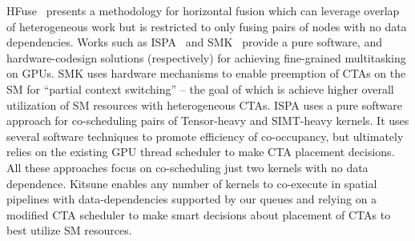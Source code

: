 HFuse~\cite{horizontal-fusion:cgo2022} presents a methodology for horizontal fusion which can leverage overlap of heterogeneous work but is restricted to only fusing pairs of nodes with no data dependencies. Works such as ISPA~\cite{zhao2022ispa} and SMK~\cite{wang2016simultaneous} provide a pure software, and hardware-codesign solutions (respectively) for achieving fine-grained multitasking on GPUs. SMK uses hardware mechanisms to enable preemption of CTAs on the SM for ``partial context switching'' -- the goal of which is achieve higher overall utilization of SM resources with heterogeneous CTAs. ISPA uses a pure software approach for co-scheduling pairs of Tensor-heavy and SIMT-heavy kernels. It uses several software techniques to promote efficiency of co-occupancy, but ultimately relies on the existing GPU thread scheduler to make CTA placement decisions. All these approaches focus on co-scheduling just two kernels with no data dependence. Kitsune enables any number of kernels to co-execute in spatial pipelines with data-dependencies supported by our queues and relying on a modified CTA scheduler to make smart decisions about placement of CTAs to best utilize SM resources.


 

